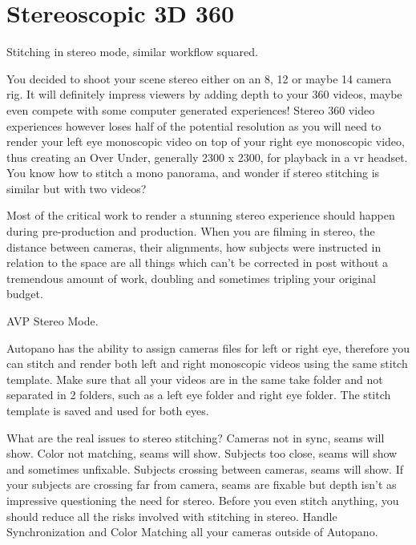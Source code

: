 \chapter{Stereoscopic 3D 360}
\pagecolor{white}
\label{chap:42}
\begin{fullwidth}

\problem

{\large Stitching in stereo mode, similar workflow squared. \par}

You decided to shoot your scene stereo either on an 8, 12 or maybe 14 camera rig. It will definitely impress viewers by adding depth to your 360 videos, maybe even compete with some computer generated experiences! Stereo 360 video experiences however loses half of the potential resolution as you will need to render your left eye monoscopic video on top of your right eye monoscopic video, thus creating an Over Under, generally 2300 x 2300, for playback in a vr headset. You know how to stitch a mono panorama, and wonder if stereo stitching is similar but with two videos?

\solution

Most of the critical work to render a stunning stereo experience should happen during pre-production and production. When you are filming in stereo, the distance between cameras, their alignments, how subjects were instructed in relation to the space are all things which can’t be corrected in post without a tremendous amount of work, doubling and sometimes tripling your original budget. 

{\large AVP Stereo Mode. \par}

Autopano has the ability to assign cameras files for left or right eye, therefore you can stitch and render both left and right monoscopic videos using the same stitch template. Make sure that all your videos are in the same take folder and not separated in 2 folders, such as a left eye folder and right eye folder. The stitch template is saved and used for both eyes. 


What are the real issues to stereo stitching? Cameras not in sync, seams will show. Color not matching, seams will show. Subjects too close, seams will show and sometimes unfixable. Subjects crossing between cameras, seams will show. If your subjects are crossing far from camera, seams are fixable but depth isn’t as impressive questioning the need for stereo. Before you even stitch anything, you should reduce all the risks involved with stitching in stereo. Handle Synchronization and Color Matching all your cameras outside of Autopano.


\end{fullwidth}
